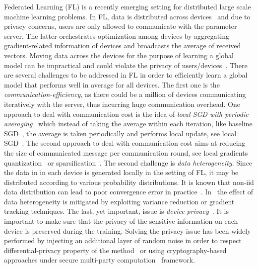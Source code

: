 \documentclass[twoside]{article}
\begin{document}
Federated Learning (FL) is a recently emerging setting for distributed large scale machine learning problems. 
In FL, data is distributed across devices~\cite{mcmahan2016communication,konevcny2016federated} and due to privacy concerns, users are only allowed to communicate with the parameter server. 
The latter orchestrates optimization among devices by aggregating gradient-related information of devices and broadcasts the average of received vectors. 
Moving data across the devices for the purpose of learning a global model can be impractical and could violate the privacy of users/devices~\cite{carlini2019secret,mcmahan2017learning}. 
There are several challenges to be addressed in FL in order to efficiently learn a global model that performs well in average for all devices. 
The first one is the \emph{communication-efficiency}, as there could be a million of devices communicating iteratively with the server, thus incurring huge communication overhead. 
One approach to deal with communication cost is the idea of \emph{local SGD with periodic averaging}~\cite{zhou2018convergence,stich2019local,yu2019parallel,wang2018cooperative} which instead of taking the average within each iteration, like baseline SGD~\cite{bottou-bousquet-2008}, the average is taken periodically and performs local update, see local SGD~\cite{lin2019don}. 
The second approach to deal with communication cost aims at reducing the size of communicated message per communication round, see local gradients quantization~\cite{alistarh2017qsgd,bernstein2018signsgd,tang2018communication,wen2017terngrad,wu2018error} or sparsification~\cite{alistarh2018convergence,lin2017deep,stich2018sparsified,stich2019error}.%
The second challenge is \emph{data heterogeneity}. 
Since the data in in each device is generated locally in the setting of FL, it may be distributed according to various probability distributions. 
It is known that non-iid data distribution can lead to poor convergence error in practice~\cite{li2019federated,liang2019variance}. 
In~\cite{liang2019variance,karimireddy2019scaffold,horvath2019stochastic,haddadpour2020federated} the effect of data heterogeneity is mitigated by exploiting variance reduction or gradient tracking techniques.
The last, yet important, issue is \emph{device privacy}~\cite{geyer2017differentially,hardy2017private}. 
It is important to make sure that the privacy of the sensitive information on each device is preserved during the training.
Solving the privacy issue has been widely performed by injecting an additional layer of random noise in order to respect differential-privacy property of the method~\cite{mcmahan2017learning} or using cryptography-based approaches under secure multi-party computation~\cite{bonawitz2017practical} framework.
\end{document}
